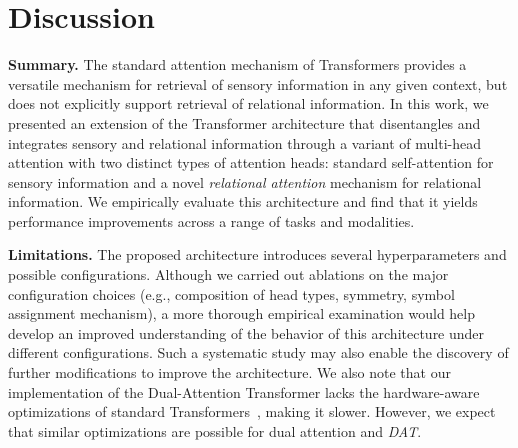 \section{Discussion}\label{sec:discussion}

\textbf{Summary.} The standard attention mechanism of Transformers provides a versatile mechanism for retrieval of sensory information in any given context, but does not explicitly support retrieval of relational information. In this work, we presented an extension of the Transformer architecture that disentangles and integrates sensory and relational information through a variant of multi-head attention with two distinct types of attention heads: standard self-attention for sensory information and a novel \textit{relational attention} mechanism for relational information. We empirically evaluate this architecture and find that it yields performance improvements across a range of tasks and modalities.

\textbf{Limitations.} The proposed architecture introduces several hyperparameters and possible configurations. Although we carried out ablations on the major configuration choices (e.g., composition of head types, symmetry, symbol assignment mechanism), a more thorough empirical examination would help develop an improved understanding of the behavior of this architecture under different configurations. Such a systematic study may also enable the discovery of further modifications to improve the architecture. We also note that our implementation of the Dual-Attention Transformer lacks the hardware-aware optimizations of standard Transformers~\citep{dao2022flashattention}, making it slower. However, we expect that similar optimizations are possible for dual attention and \textit{DAT}.
